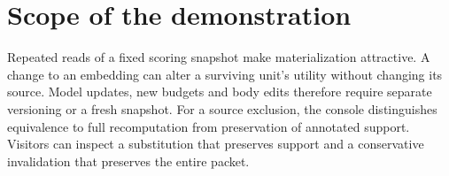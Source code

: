 \documentclass[conference]{IEEEtran}
\begin{document}
\section{Scope of the demonstration}
Repeated reads of a fixed scoring snapshot make materialization attractive. A change to an embedding can alter a surviving unit’s utility without changing its source. Model updates, new budgets and body edits therefore require separate versioning or a fresh snapshot. For a source exclusion, the console distinguishes equivalence to full recomputation from preservation of annotated support. Visitors can inspect a substitution that preserves support and a conservative invalidation that preserves the entire packet.



\end{document}
